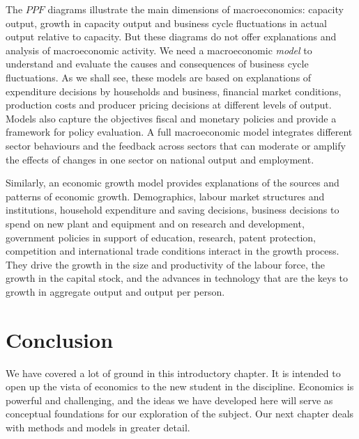 The $PPF$ diagrams illustrate the main dimensions of macroeconomics: capacity output, growth in capacity output and business cycle fluctuations in actual output relative to capacity. But these diagrams do not offer explanations and analysis of macroeconomic activity. We need a macroeconomic \textit{model} to understand and evaluate the causes and consequences of business cycle fluctuations. As we shall see, these models are based on explanations of expenditure decisions by households and business, financial market conditions, production costs and producer pricing decisions at different levels of output. Models also capture the objectives fiscal and monetary policies and provide a framework for policy evaluation.  A full macroeconomic model integrates different sector behaviours and the feedback across sectors that can moderate or amplify the effects of changes in one sector on national output and employment. 

Similarly, an economic growth model provides explanations of the sources and patterns of economic growth. Demographics, labour market structures and institutions, household expenditure and saving decisions, business decisions to spend on new plant and equipment and on research and development,  government policies in support of education, research, patent protection, competition and international trade conditions interact in the growth process. They drive the growth in the size and productivity of the labour force, the growth in the capital stock, and the advances in technology that are the keys to growth in aggregate output and output per person.

\section*{Conclusion}

We have covered a lot of ground in this introductory chapter. It is intended to open up the vista of economics to the new student in the discipline. Economics is powerful and challenging, and the ideas we have developed here will serve as conceptual foundations for our exploration of the subject. Our next chapter deals with methods and models in greater detail.


